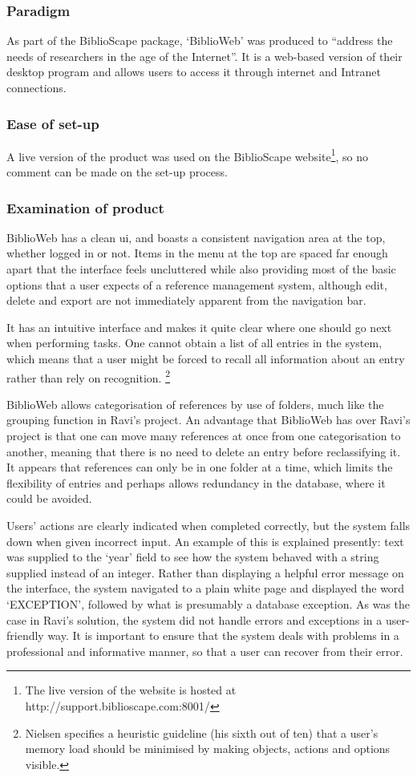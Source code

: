 \documentclass{l4proj}
\begin{document}
\subsubsection{Paradigm}
As part of the BiblioScape package, `BiblioWeb' was produced to ``address the needs of researchers in the age of the Internet''.  It is a web-based version of their desktop program and allows users to access it through internet and Intranet connections.
\subsubsection{Ease of set-up}
A live version of the product was used on the BiblioScape website\footnote{The live version of the website is hosted at http://support.biblioscape.com:8001/}, so no comment can be made on the set-up process.
\subsubsection{Examination of product}
BiblioWeb has a clean \gls{ui}, and boasts a consistent navigation area at the top, whether logged in or not.  Items in the menu at the top are spaced far enough apart that the interface feels uncluttered while also providing most of the basic options that a user expects of a reference management system, although edit, delete and export are not immediately apparent from the navigation bar. 

It has an intuitive interface and makes it quite clear where one should go next when performing tasks.  One cannot obtain a list of all entries in the system, which means that a user might be forced to recall all information about an entry rather than rely on recognition. \footnote{Nielsen specifies a heuristic guideline (his sixth out of ten) that a user's memory load should be minimised by making objects, actions and options visible.}

BiblioWeb allows categorisation of references by use of folders, much like the grouping function in Ravi's project.  An advantage that BiblioWeb has over Ravi's project is that one can move many references at once from one categorisation to another, meaning that there is no need to delete an entry before reclassifying it.  It appears that references can only be in one folder at a time, which limits the flexibility of entries and perhaps allows redundancy in the database, where it could be avoided.

Users' actions are clearly indicated when completed correctly, but the system falls down when given incorrect input.  An example of this is explained presently: text was supplied to the `year' field to see how the system behaved with a string supplied instead of an integer.  Rather than displaying a helpful error message on the interface, the system navigated to a plain white page and displayed the word `EXCEPTION', followed by what is presumably a database exception.  As was the case in Ravi's solution, the system did not handle errors and exceptions in a user-friendly way.  It is important to ensure that the system deals with problems in a professional and informative manner, so that a user can recover from their error.
\end{document}
